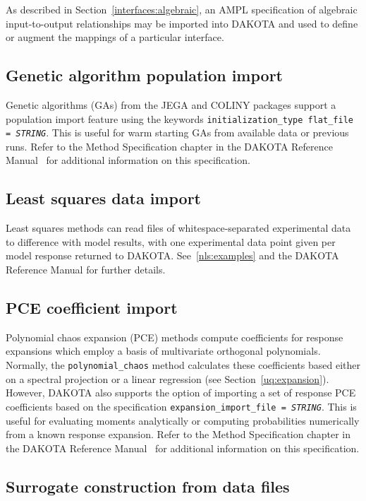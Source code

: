 As described in Section~\ref{interfaces:algebraic}, an AMPL
specification of algebraic input-to-output relationships may be
imported into DAKOTA and used to define or augment the mappings of a
particular interface.

\subsection{Genetic algorithm population import}

Genetic algorithms (GAs) from the JEGA and COLINY packages support a 
population import feature using the keywords 
\texttt{initialization\_type flat\_file = \emph{STRING}}.  This is 
useful for warm starting GAs from available data or previous runs.
Refer to the Method Specification chapter in the DAKOTA Reference
Manual~\cite{RefMan} for additional information on this specification.

\subsection{Least squares data import}

Least squares methods can read files of whitespace-separated
experimental data to difference with model results, with one
experimental data point given per model response returned to DAKOTA.
See~\ref{nls:examples} and the DAKOTA Reference Manual for further
details.

\subsection{PCE coefficient import}

Polynomial chaos expansion (PCE) methods compute coefficients for
response expansions which employ a basis of multivariate orthogonal
polynomials.  Normally, the \texttt{polynomial\_chaos} method
calculates these coefficients based either on a spectral projection or
a linear regression (see Section~\ref{uq:expansion}).  However,
DAKOTA also supports the option of importing a set of response PCE
coefficients based on the specification
\texttt{expansion\_import\_file = \emph{STRING}}.  This is useful for
evaluating moments analytically or computing probabilities numerically
from a known response expansion.  Refer to the Method Specification
chapter in the DAKOTA Reference Manual~\cite{RefMan} for additional
information on this specification.

\subsection{Surrogate construction from data files}

